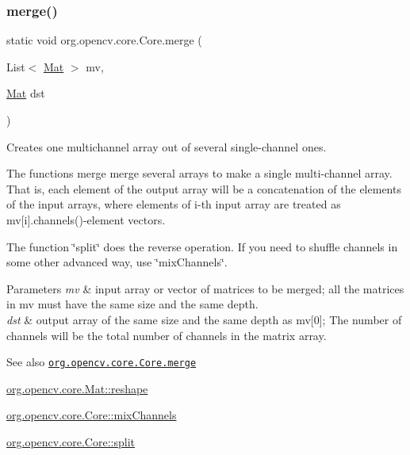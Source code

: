 \subsubsection{\texorpdfstring{merge()}{merge()}}
{\footnotesize\ttfamily static void org.\+opencv.\+core.\+Core.\+merge (\begin{DoxyParamCaption}\item[{List$<$ \mbox{\hyperlink{classorg_1_1opencv_1_1core_1_1_mat}{Mat}} $>$}]{mv,  }\item[{\mbox{\hyperlink{classorg_1_1opencv_1_1core_1_1_mat}{Mat}}}]{dst }\end{DoxyParamCaption})\hspace{0.3cm}{\ttfamily [static]}}

Creates one multichannel array out of several single-\/channel ones.

The functions {\ttfamily merge} merge several arrays to make a single multi-\/channel array. That is, each element of the output array will be a concatenation of the elements of the input arrays, where elements of i-\/th input array are treated as {\ttfamily mv\mbox{[}i\mbox{]}.channels()}-\/element vectors.

The function \char`\"{}split\char`\"{} does the reverse operation. If you need to shuffle channels in some other advanced way, use \char`\"{}mix\+Channels\char`\"{}.


\begin{DoxyParams}{Parameters}
{\em mv} & input array or vector of matrices to be merged; all the matrices in {\ttfamily mv} must have the same size and the same depth. \\
\hline
{\em dst} & output array of the same size and the same depth as {\ttfamily mv\mbox{[}0\mbox{]}}; The number of channels will be the total number of channels in the matrix array.\\
\hline
\end{DoxyParams}
\begin{DoxySeeAlso}{See also}
\href{http://docs.opencv.org/modules/core/doc/operations_on_arrays.html#merge}{\tt org.\+opencv.\+core.\+Core.\+merge} 

\mbox{\hyperlink{classorg_1_1opencv_1_1core_1_1_mat_ac272e7518dba0da8e7480df63163040b}{org.\+opencv.\+core.\+Mat\+::reshape}} 

\mbox{\hyperlink{classorg_1_1opencv_1_1core_1_1_core_a812a71941c37c615cb474bff0eacbb2e}{org.\+opencv.\+core.\+Core\+::mix\+Channels}} 

\mbox{\hyperlink{classorg_1_1opencv_1_1core_1_1_core_aa22f046c4f14cda50c10f5d22ffdbb26}{org.\+opencv.\+core.\+Core\+::split}} 
\end{DoxySeeAlso}
\mbox{\label{classorg_1_1opencv_1_1core_1_1_core_a24561bfde2c7fe7d2b7bee9d5ba8c92e}} 
